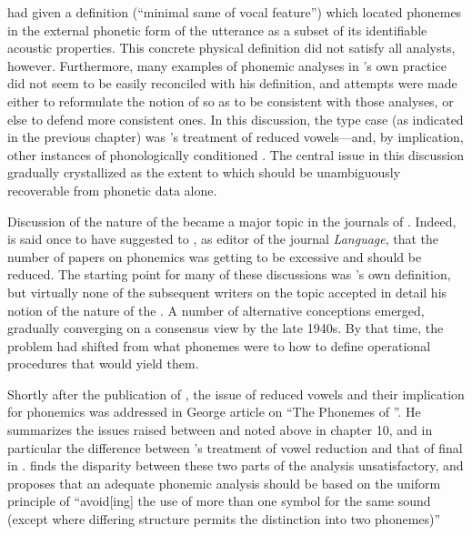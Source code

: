 {\Bloomfield} had given a definition (``minimal same of vocal feature'')
which located phonemes in the external phonetic form of the utterance
as a subset of its identifiable acoustic properties. This concrete
physical definition did not satisfy all analysts,
however. Furthermore, many examples of phonemic analyses in
{\Bloomfield}'s own practice did not seem to be easily reconciled with
his definition, and attempts were made either to reformulate the
notion of  so as to be consistent with those analyses, or else
to defend more consistent ones. In this discussion, the type case (as
indicated in the previous chapter) was {\Bloomfield}'s treatment of
reduced vowels—and, by implication, other instances of phonologically
conditioned . The central issue in this discussion
gradually crystallized as the extent to which 
should be unambiguously recoverable from phonetic data alone.

Discussion of the nature of the  became a major topic in the
journals of . Indeed, {\Bloomfield} is said once to
have suggested to {\Bloch}, as editor of the journal \textsl{Language},
that the number of papers on phonemics was getting to be excessive and
should be reduced. The starting point for many of these discussions
was {\Bloomfield}'s own definition, but virtually none of the subsequent
writers on the topic accepted in detail his notion of the nature of
the . A number of alternative conceptions emerged, gradually
converging on a consensus view by the late 1940s. By that time, the
problem had shifted from what phonemes were to how to define
operational procedures that would yield them.

Shortly after the publication of \citealt{bloomfield:lg}, the issue of
reduced vowels and their implication for phonemics was addressed in
George  article on ``The Phonemes of
''. He summarizes the issues raised between {\Bloomfield} and
\citet{kent34:rvw.bloomfield} noted above in chapter 10, and in
particular the difference between {\Bloomfield}'s treatment of vowel
reduction and that of final  in . {\Trager} finds the
disparity between these two parts of the analysis unsatisfactory, and
proposes that an adequate phonemic analysis should be based on the
uniform principle of ``avoid[ing] the use of more than one symbol for
the same sound (except where differing structure permits the
distinction into two phonemes)'' \citep[339]{trager34:russian}

